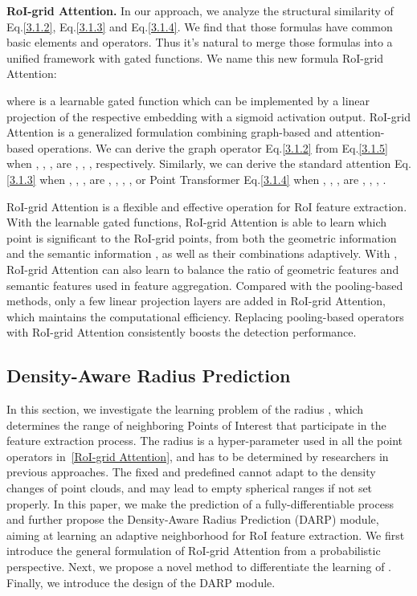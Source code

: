 \documentclass[10pt,twocolumn,letterpaper]{article}
\begin{document}
\textbf{RoI-grid Attention.} In our approach, we analyze the structural similarity of Eq.\ref{3.1.2}, Eq.\ref{3.1.3} and Eq.\ref{3.1.4}. We find that those formulas have common basic elements and operators. Thus it's natural to merge those formulas into a unified framework with gated functions. We name this new formula RoI-grid Attention:

where  is a learnable gated function which can be implemented by a linear projection of the respective embedding with a sigmoid activation output. RoI-grid Attention is a generalized formulation combining graph-based and attention-based operations. We can derive the graph operator Eq.\ref{3.1.2} from Eq.\ref{3.1.5} when , , ,  are , , ,  respectively. Similarly, we can derive the standard attention Eq.\ref{3.1.3} when , , ,  are , , , , or Point Transformer Eq.\ref{3.1.4} when , , ,  are , , , .

RoI-grid Attention is a flexible and effective operation for RoI feature extraction. With the learnable gated functions, RoI-grid Attention is able to learn which point is significant to the RoI-grid points, from both the geometric information  and the semantic information , as well as their combinations  adaptively. With , RoI-grid Attention can also learn to balance the ratio of geometric features  and semantic features  used in feature aggregation. Compared with the pooling-based methods, only a few linear projection layers are added in RoI-grid Attention, which maintains the computational efficiency. Replacing pooling-based operators with RoI-grid Attention consistently boosts the detection performance.

\subsection{Density-Aware Radius Prediction} \label{Density-Aware Radius Prediction}
In this section, we investigate the learning problem of the radius , which determines the range   of neighboring Points of Interest that participate in the feature extraction process. The radius  is a hyper-parameter used in all the point operators in~\ref{RoI-grid Attention}, and has to be determined by researchers in previous approaches. The fixed and predefined  cannot adapt to the density changes of point clouds, and may lead to empty spherical ranges if not set properly. In this paper, we make the prediction of  a fully-differentiable process and further propose the Density-Aware Radius Prediction (DARP) module, aiming at learning an adaptive neighborhood for RoI feature extraction. We first introduce the general formulation of RoI-grid Attention from a probabilistic perspective. Next, we propose a novel method to differentiate the learning of . Finally, we introduce the design of the DARP module.
\end{document}

